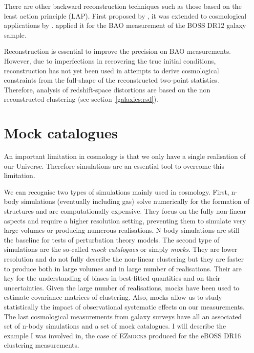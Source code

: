 There are other backward reconstruction techniques such as those based on the least action principle (LAP).
First proposed by \cite{peeblesTracingGalaxyOrbits1989}, it was extended to cosmological applications 
by \cite{nusserLeastActionPrinciple2000, sarpaBAOReconstructionSwift2019}. 
\cite{sarpaExtendedFastAction2021} applied it for the BAO measurement of the BOSS DR12 galaxy sample. 

Reconstruction is essential to improve the precision on BAO measurements. However, 
due to imperfections in recovering the true initial conditions, 
reconstruction has not yet been used in attempts to derive cosmological 
constraints from the full-shape of the reconstructed two-point statistics.
Therefore, analysis of redshift-space distortions are based on the non reconstructed 
clustering (see section~\ref{galaxies:rsd}).  

\section{Mock catalogues}
\label{galaxies:mocks}

An important limitation in cosmology is that we only have a single realisation of our Universe. 
Therefore simulations are an essential tool to overcome this limitation. 

We can recognise two types of simulations mainly used in cosmology. First, 
n-body simulations (eventually including gas) solve numerically for the formation of structures
and are computationally expensive. They focus on the fully non-linear aspects and require a 
higher resolution setting, preventing them to simulate very large volumes or producing numerous 
realisations. N-body simulations are still the baseline for tests of perturbation theory models. 
The second type of simulations are the so-called \emph{mock catalogues} or simply \emph{mocks}. 
They are lower resolution and do not fully describe the non-linear clustering but they are 
faster to produce both in large volumes and in large number of realisations.
Their are key for the understanding of biases in best-fitted quantities and on their uncertainties. 
Given the large number of realisations, mocks have been used to estimate covariance matrices of 
clustering. Also, mocks allow us to study statistically the impact of observational systematic effects on our 
measurements. The last cosmological measurements from galaxy surveys have all an associated set of 
n-body simulations and a set of mock catalogues. I will describe the example I was involved in, 
the case of \textsc{EZmocks} produced for the eBOSS DR16 clustering measurements. 

